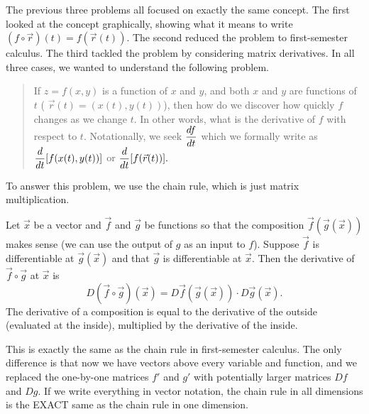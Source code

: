 The previous three problems all focused on exactly the same concept.  The first looked at the concept graphically, showing  what it means to write $(f\circ \vec r)(t)=f(\vec r(t))$. The second reduced the problem to first-semester calculus. The third tackled the problem by considering matrix derivatives.  In all three cases, we wanted to understand the following problem.
\begin{quote}
 If $z=f(x,y)$ is a function of $x$ and $y$, and both $x$ and $y$ are functions of $t$ ( $\vec r(t)=(x(t),y(t))$), then how do we discover how quickly $f$ changes as we change $t$. In other words, what is the derivative of $f$ with respect to $t$. Notationally, we seek $\displaystyle \frac{df}{dt}$ which we formally write as $\displaystyle \frac{d}{dt}[f(x(t),y(t))]$ or $\displaystyle \frac{d}{dt} [f(\vec r(t))].$
\end{quote}
To answer this problem, we use the chain rule, which is just matrix multiplication.
\begin{theorem}\label{chain rule def}
 Let $\vec x$ be a vector and $\vec f$ and $\vec g$ be functions so that the composition $\vec f(\vec g(\vec x))$ makes sense (we can use the output of $g$ as an input to $f$). Suppose $\vec f$ is differentiable at $\vec g(\vec x)$ and that $\vec g$ is differentiable at $\vec x$. Then the derivative of $\vec f\circ \vec g$ at $\vec x$ is 
$$D(\vec f\circ \vec g)(\vec x) = D\vec f(\vec g(\vec x))\cdot D\vec g(\vec x).$$
 The derivative of a composition is equal to the derivative of the outside (evaluated at the inside), multiplied by the derivative of the inside.  
\end{theorem}
This is exactly the same as the chain rule in first-semester calculus.  The only difference is that now we have vectors above every variable and function, and we replaced the one-by-one matrices $f'$ and $g'$ with potentially larger matrices $Df$ and $Dg$. If we write everything in vector notation, the chain rule in all dimensions is the EXACT same as the chain rule in one dimension.


